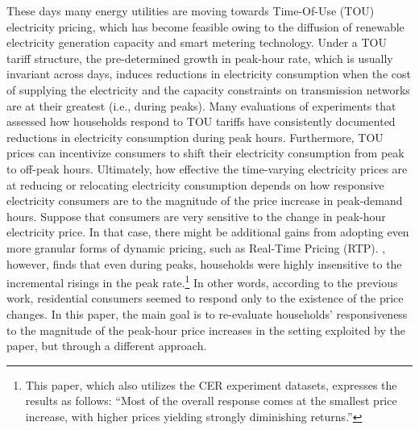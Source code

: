 These days many energy utilities are moving towards Time-Of-Use (TOU) electricity pricing, which has become feasible owing to the diffusion of renewable electricity generation capacity and smart metering technology. Under a TOU tariff structure, the pre-determined growth in peak-hour rate, which is usually invariant across days, induces reductions in electricity consumption when the cost of supplying the electricity and the capacity constraints on transmission networks are at their greatest (i.e., during peaks). Many evaluations of experiments that assessed how households respond to TOU tariffs have consistently documented reductions in electricity consumption during peak hours. Furthermore, TOU prices can incentivize consumers to shift their electricity consumption from peak to off-peak hours. Ultimately, how effective the time-varying electricity prices are at reducing or relocating electricity consumption depends on how responsive electricity consumers are to the magnitude of the price increase in peak-demand hours. 
Suppose that consumers are very sensitive to the change in peak-hour electricity price. In that case, there might be additional gains from adopting even more granular forms of dynamic pricing, such as Real-Time Pricing (RTP). \cite{Peaking-Interest:How-Awareness-Drives-the-Effectiveness-of-Time-of-Use-Electricity-Pricing_Prest_2020}, however, finds that even during peaks, households were highly insensitive to the incremental risings in the peak rate.\footnote{This paper, which also utilizes the CER experiment datasets, expresses the results as follows: ``Most of the overall response comes at the smallest price increase, with higher prices yielding strongly diminishing returns.''} In other words, according to the previous work, residential consumers seemed to respond only to the existence of the price changes. In this paper, the main goal is to re-evaluate households' responsiveness to the magnitude of the peak-hour price increases in the setting exploited by the paper, but through a different approach. 

